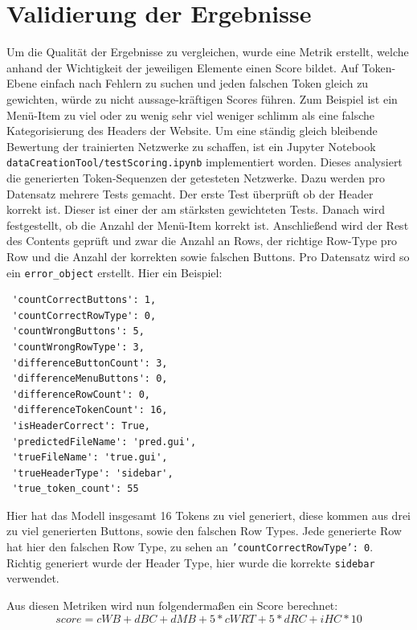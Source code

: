 \documentclass[pdftex,a4paper,halfparskip, article]{scrartcl}
\begin{document}
\newpage
\section{Validierung der Ergebnisse}

Um die Qualität der Ergebnisse zu vergleichen, wurde eine Metrik erstellt, welche anhand der Wichtigkeit der jeweiligen Elemente einen Score bildet. Auf Token-Ebene einfach nach Fehlern zu suchen und jeden falschen Token gleich zu gewichten, würde zu nicht aussage-kräftigen Scores führen. Zum Beispiel ist ein Menü-Item zu viel oder zu wenig sehr viel weniger schlimm als eine falsche Kategorisierung des Headers der Website. Um eine ständig gleich bleibende Bewertung der trainierten Netzwerke zu schaffen, ist ein Jupyter Notebook \texttt{dataCreationTool/testScoring.ipynb} implementiert worden. Dieses analysiert die generierten Token-Sequenzen der getesteten Netzwerke. Dazu werden pro Datensatz mehrere Tests gemacht. Der erste Test überprüft ob der Header korrekt ist. Dieser ist einer der am stärksten gewichteten Tests. Danach wird festgestellt, ob die Anzahl der Menü-Item korrekt ist. Anschließend wird der Rest des Contents geprüft und zwar die Anzahl an Rows, der richtige Row-Type pro Row und die Anzahl der korrekten sowie falschen Buttons. Pro Datensatz wird so ein \texttt{error\_object} erstellt. 
Hier ein Beispiel:

\begin{verbatim}
 'countCorrectButtons': 1,
 'countCorrectRowType': 0,
 'countWrongButtons': 5,
 'countWrongRowType': 3,
 'differenceButtonCount': 3,
 'differenceMenuButtons': 0,
 'differenceRowCount': 0,
 'differenceTokenCount': 16,
 'isHeaderCorrect': True,
 'predictedFileName': 'pred.gui',
 'trueFileName': 'true.gui',
 'trueHeaderType': 'sidebar',
 'true_token_count': 55
\end{verbatim}


Hier hat das Modell insgesamt 16 Tokens zu viel generiert, diese kommen aus drei zu viel generierten Buttons, sowie den falschen Row Types. Jede generierte Row hat hier den falschen Row Type, zu sehen an \texttt{'countCorrectRowType': 0}. Richtig generiert wurde der Header Type, hier wurde die korrekte \texttt{sidebar} verwendet.

Aus diesen Metriken wird nun folgendermaßen ein Score berechnet:        
\begin{equation}
score = cWB + dBC + dMB + 5 * cWRT + 5 * dRC + iHC * 10
\end{equation}
\end{document}
